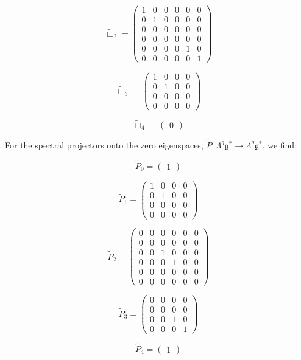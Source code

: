 \documentclass[reqno,12pt]{amsart}
\newcommand\goe{\mathfrak g}
\theoremstyle{plain}
\theoremstyle{definition}
\begin{document}
$$
\tilde\Box_2=\left(\begin{array}{c|cc|cc|c}
1&0&0&0&0&0\\\hline
0&1&0&0&0&0\\
0&0&0&0&0&0\\\hline
0&0&0&0&0&0\\
0&0&0&0&1&0\\\hline
0&0&0&0&0&1
\end{array}\right)
$$

$$
\tilde\Box_3=\left(\begin{array}{c|c|cc}
1&0&0&0\\\hline
0&1&0&0\\\hline
0&0&0&0\\
0&0&0&0
\end{array}\right)
$$

$$
\tilde\Box_4=\left(\begin{array}{c}
0
\end{array}\right)
$$

For the spectral projectors onto the zero eigenspaces, $\tilde P\colon\Lambda^q\goe^*\to\Lambda^q\goe^*$, we find:

$$
\tilde P_0=\left(\begin{array}{c}
1
\end{array}\right)
$$

$$
\tilde P_1=\left(\begin{array}{cc|c|c}
1&0&0&0\\
0&1&0&0\\\hline
0&0&0&0\\\hline
0&0&0&0
\end{array}\right)
$$

$$
\tilde P_2=\left(\begin{array}{c|cc|cc|c}
0&0&0&0&0&0\\\hline
0&0&0&0&0&0\\
0&0&1&0&0&0\\\hline
0&0&0&1&0&0\\
0&0&0&0&0&0\\\hline
0&0&0&0&0&0
\end{array}\right)
$$

$$
\tilde P_3=\left(\begin{array}{c|c|cc}
0&0&0&0\\\hline
0&0&0&0\\\hline
0&0&1&0\\
0&0&0&1
\end{array}\right)
$$

$$
\tilde P_4=\left(\begin{array}{c}
1
\end{array}\right)
$$
\end{document}
